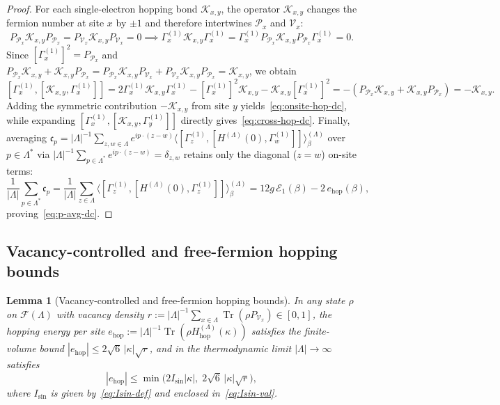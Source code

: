 \documentclass[11pt]{article}
\newtheorem{lemma}[theorem]{Lemma}
\theoremstyle{definition}
\theoremstyle{remark}
\DeclareMathOperator{\Tr}{Tr}
\newcommand{\calF}{\mathcal{F}}
\newcommand{\calP}{\mathcal{P}}
\newcommand{\calV}{\mathcal{V}}
\newcommand{\calE}{\mathcal{E}}
\newcommand{\calK}{\mathcal{K}}
\begin{document}
\begin{proof}
For each single-electron hopping bond $\calK_{x,y}$, the operator $\calK_{x,y}$ changes the fermion number at site $x$ by $\pm 1$ and therefore intertwines $\calP_x$ and $\calV_x$:
\begin{equation}\label{eq:K-parity}
P_{\calP_x} \calK_{x,y} P_{\calP_x} = P_{\calV_x} \calK_{x,y} P_{\calV_x} = 0 \implies \Gamma_x^{(1)} \calK_{x,y} \Gamma_x^{(1)} = \Gamma_x^{(1)} P_{\calP_x} \calK_{x,y} P_{\calP_x} \Gamma_x^{(1)} = 0.
\end{equation}
Since $[\Gamma_x^{(1)}]^2 = P_{\calP_x}$ and $P_{\calP_x} \calK_{x,y} + \calK_{x,y} P_{\calP_x} = P_{\calP_x}\calK_{x,y}P_{\calV_x} + P_{\calV_x}\calK_{x,y}P_{\calP_x} = \calK_{x,y}$, we obtain
\begin{equation}\label{eq:K-single-dc}
[\Gamma_x^{(1)}, [\calK_{x,y}, \Gamma_x^{(1)}]] = 2\Gamma_x^{(1)}\calK_{x,y}\Gamma_x^{(1)} - [\Gamma_x^{(1)}]^2 \calK_{x,y} - \calK_{x,y}[\Gamma_x^{(1)}]^2 = -(P_{\calP_x}\calK_{x,y} + \calK_{x,y}P_{\calP_x}) = -\calK_{x,y}.
\end{equation}
Adding the symmetric contribution $-\calK_{x,y}$ from site $y$ yields~\eqref{eq:onsite-hop-dc}, while expanding $[\Gamma_x^{(1)}, [\calK_{x,y}, \Gamma_y^{(1)}]]$ directly gives~\eqref{eq:cross-hop-dc}. Finally, averaging $\mathfrak{c}_p = |\Lambda|^{-1}\sum_{z,w \in \Lambda} e^{ip\cdot(z-w)} \langle [\Gamma_z^{(1)}, [H^{(\Lambda)}(0), \Gamma_w^{(1)}]] \rangle_\beta^{(\Lambda)}$ over $p \in \Lambda^*$ via $|\Lambda|^{-1}\sum_{p \in \Lambda^*} e^{ip\cdot(z-w)} = \delta_{z,w}$ retains only the diagonal ($z = w$) on-site terms:
\begin{equation*}
\frac{1}{|\Lambda|}\sum_{p \in \Lambda^*} \mathfrak{c}_p = \frac{1}{|\Lambda|} \sum_{z \in \Lambda} \langle [\Gamma_z^{(1)}, [H^{(\Lambda)}(0), \Gamma_z^{(1)}]] \rangle_\beta^{(\Lambda)} = 12 g\,\calE_1(\beta) - 2\,e_{\mathrm{hop}}(\beta),
\end{equation*}
proving~\eqref{eq:p-avg-dc}.
\end{proof}

\subsection{Vacancy-controlled and free-fermion hopping bounds}\label{subsec:hopping}

\begin{lemma}[Vacancy-controlled and free-fermion hopping bounds]\label{lem:hopping}
In any state $\rho$ on $\calF(\Lambda)$ with vacancy density $r := |\Lambda|^{-1}\sum_{x\in\Lambda} \Tr(\rho P_{\calV_x}) \in [0, 1]$, the hopping energy per site $e_{\mathrm{hop}} := |\Lambda|^{-1}\Tr(\rho H_{\mathrm{hop}}^{(\Lambda)}(\kappa))$ satisfies the finite-volume bound $|e_{\mathrm{hop}}| \le 2\sqrt{6}\,|\kappa|\sqrt{r}$, and in the thermodynamic limit $|\Lambda| \to \infty$ satisfies
\begin{equation}\label{eq:ehop-bound}
|e_{\mathrm{hop}}| \le \min\!\Big(2 I_{\sin}|\kappa|,\; 2\sqrt{6}\,|\kappa|\sqrt{r}\Big),
\end{equation}
where $I_{\sin}$ is given by~\eqref{eq:Isin-def} and enclosed in~\eqref{eq:Isin-val}.
\end{lemma}
\end{document}
